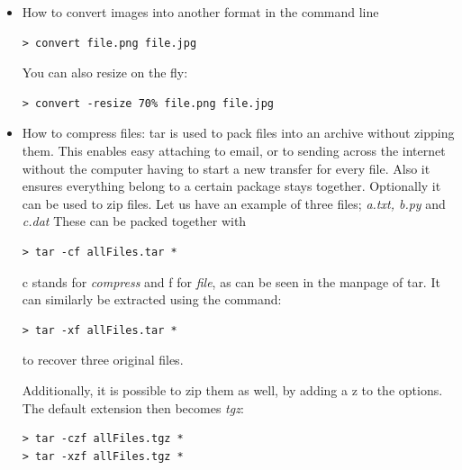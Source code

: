 \begin{itemize}
\item How to convert images into another format in the command line

\begin{verbatim}
> convert file.png file.jpg
\end{verbatim}

You can also resize on the fly:

\begin{verbatim}
> convert -resize 70% file.png file.jpg
\end{verbatim}


\item How to compress files:
tar is used to pack files into an archive without zipping them. 
This enables easy attaching to email, or to sending across the internet without the computer having
to start a new transfer for every file. 
Also it ensures everything belong to a certain package stays together.
Optionally it can be used to zip files.
Let us have an example of three files; {\it a.txt, b.py} and {\it c.dat}
These can be packed together with

\begin{verbatim}
> tar -cf allFiles.tar *
\end{verbatim}

c stands for {\it compress} and f for {\it file}, as can be seen in the manpage of tar.
It can similarly be extracted using the command:

\begin{verbatim}
> tar -xf allFiles.tar *
\end{verbatim}

to recover three original files.

Additionally, it is possible to zip them as well, by adding a z to the options. 
The default extension then becomes {\it tgz}:

\begin{verbatim}
> tar -czf allFiles.tgz *
> tar -xzf allFiles.tgz *
\end{verbatim}



\end{itemize}

